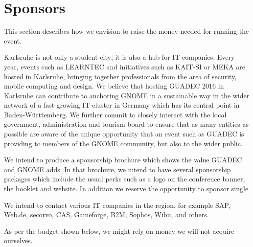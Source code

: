 \section{Sponsors}

This section describes how we envision to raise the money needed for running the event.

Karlsruhe is not only a student city; it is also a hub for IT companies. Every year, events such as LEARNTEC and initiatives such as KAIT-SI or MEKA are hosted in Karlsruhe, bringing together professionals from the area of security, mobile computing and design.
We believe that hosting GUADEC 2016 in Karlsruhe can contribute to anchoring GNOME in a sustainable way in the wider network of a fast-growing IT-cluster in Germany which has its central point in Baden-Württemberg.
We further commit to closely interact with the local government, administration and tourism board to ensure that as many entities as possible are aware of the unique opportunity that an event such as GUADEC is providing to members of the GNOME community, but also to the wider public.  

We intend to produce a sponsorship brochure which shows the value GUADEC and GNOME adds.
In that brochure, we intend to have several sponsorship packages which include the usual perks such as a logo on the conference banner, the booklet and website.
In addition we reserve the opportunity to sponsor single 

We intend to contact various IT companies in the region, for example SAP, Web.de, secorvo, 
CAS, Gameforge, B2M, 
Sophos, Wibu,
and others.


As per the budget shown below, we might rely on money we will not acquire ourselves.
